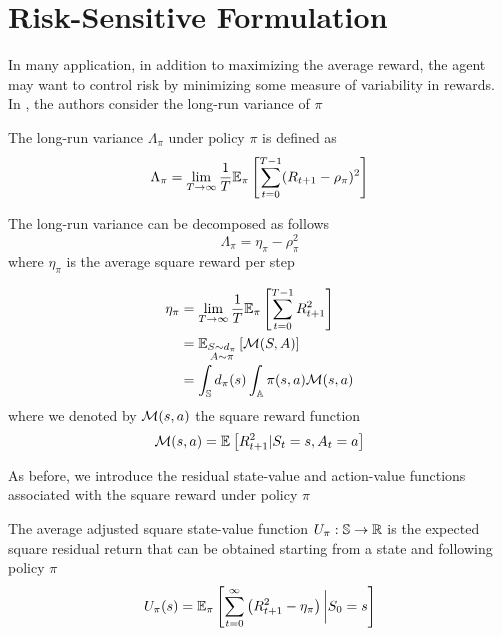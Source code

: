 \section{Risk-Sensitive Formulation}
In many application, in addition to maximizing the average reward, the agent
may want to control risk by minimizing some measure of variability in rewards.
In \cite{prashanth2014actor}, the authors consider the long-run variance of $\pi$
\begin{definition}
	The long-run variance $\Lambda_\pi$ under policy $\pi$ is defined as
	\begin{equation}
		\begin{split}
			\Lambda_\pi &= \lim_{T \to \infty} \frac{1}{T} \E[\pi]{
			\sum^{T-1}_{t=0} (R_{t+1} - \rho_\pi)^2}\\
		\end{split}
	\end{equation}
\end{definition}
The long-run variance can be decomposed as follows
\begin{equation}
	\Lambda_\pi = \eta_\pi - \rho_\pi^2 
\end{equation}
where $\eta_\pi$ is the average square reward per step  
\begin{definition}
	\begin{equation}
		\begin{split}
			\eta_\pi &= \lim_{T\to\infty}\frac{1}{T}\E[\pi]{\sum_{t=0}^{T-1} R_{t+1}^2}\\
					 &= \E[\substack{S\sim d_\pi \\ A \sim \pi}]{\calM(S,A)}\\	
					 &= \int_\S d_\pi(s) \int_\A \pi(s,a) \calM(s,a)\\
		\end{split}
	\end{equation}
	where we denoted by $\calM(s,a)$ the square reward function
	\begin{equation}
		\calM(s,a) = \E{R_{t+1}^2 | S_t = s, A_t = a}
	\end{equation}
\end{definition}
As before, we introduce the residual state-value and action-value functions 
associated with the square reward under policy $\pi$
\begin{definition}
	The average adjusted square state-value function $U_\pi : \S \to \R$ is the
	expected square residual return that can be obtained starting from a state 
	and following policy $\pi$
	\begin{equation}
		U_\pi(s) = \E[\pi]{\sum^{\infty}_{t=0} \left(R_{t+1}^2 - \eta_\pi\right)
		\bigg| S_0 = s}
	\end{equation}
\end{definition}
